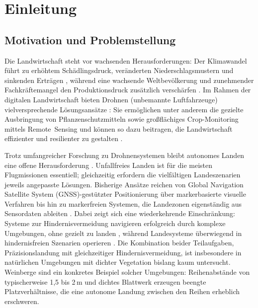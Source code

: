 \chapter{Einleitung}
\label{cha:Einleitung}

\section{Motivation und Problemstellung}
Die Landwirtschaft steht vor wachsenden Herausforderungen: Der Klimawandel führt zu erhöhtem Schädlingsdruck, veränderten Niederschlagsmustern und sinkenden Erträgen \autocite{calvinIPCC2023Climate2023, hultgrenImpactsClimateChange2025, pathakClimateChangeTrends2018}, während eine wachsende Weltbevölkerung und zunehmender Fachkräftemangel den Produktionsdruck zusätzlich verschärfen \autocite{foodandagricultureorganizationoftheunitednationsFutureFoodAgriculture2017, WorldPopulationProspects, duckettAgriculturalRoboticsFuture2018}. Im Rahmen der digitalen Landwirtschaft bieten Drohnen (unbemannte Luftfahrzeuge) vielversprechende Lösungsansätze \autocite{bassoDigitalAgricultureDesign2020}: Sie ermöglichen unter anderem die gezielte Ausbringung von Pflanzenschutzmitteln sowie großflächiges Crop-Monitoring mittels Remote~Sensing \autocite{mashoriRemoteSensingUAVs2026, radoglou-grammatikisCompilationUAVApplications2020} und können so dazu beitragen, die Landwirtschaft effizienter und resilienter zu gestalten \autocite{undeExpandingRoleMultirotor2025, guebsi2024drones}.

Trotz umfangreicher Forschung zu Drohnensystemen bleibt autonomes Landen eine offene Herausforderung \autocite{amendolaDroneLandingReinforcement2024}. Unfallfreies Landen ist für die meisten Flugmissionen essentiell; gleichzeitig erfordern die vielfältigen Landeszenarien jeweils angepasste Lösungen. Bisherige Ansätze reichen von Global Navigation Satellite System (GNSS)-gestützter Positionierung \autocite{patrikGNSSbasedNavigationSystems2019} über markerbasierte visuelle Verfahren \autocite{wubbenAccurateLandingUnmanned2019} bis hin zu markerfreien Systemen, die Landezonen eigenständig aus Sensordaten ableiten \autocite{bartolomeiAutonomousEmergencyLanding2022}. Dabei zeigt sich eine wiederkehrende Einschränkung: Systeme zur Hindernisvermeidung navigieren erfolgreich durch komplexe Umgebungen, ohne gezielt zu landen \autocite{loquercioLearningHighspeedFlight2021, xuNavRLLearningSafe2024}, während Landesysteme überwiegend in hindernisfreien Szenarien operieren \autocite{polvaraSimtoRealQuadrotorLanding2020, ladoszAutonomousLandingMoving2024}. Die Kombination beider Teilaufgaben, Präzisionslandung mit gleichzeitiger Hindernisvermeidung, ist insbesondere in natürlichen Umgebungen mit dichter Vegetation bislang kaum untersucht. Weinberge sind ein konkretes Beispiel solcher Umgebungen: Reihenabstände von typischerweise 1,5 bis 2\,m und dichtes Blattwerk erzeugen beengte Platzverhältnisse, die eine autonome Landung zwischen den Reihen erheblich erschweren.

